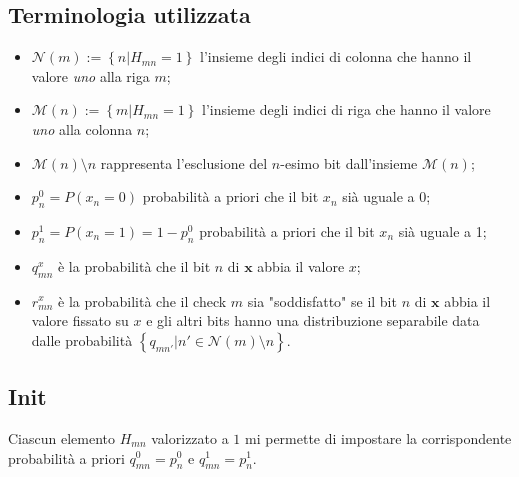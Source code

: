 \documentclass{article}
\begin{document}
	\subsection{Terminologia utilizzata}
	\begin{itemize}
		\item $\mathcal{N}(m) := \left\{ n | H_{mn} = 1 \right\}$ l'insieme degli indici di colonna che hanno il valore \textit{uno} alla riga $m$;
		\item $\mathcal{M}(n) := \left\{ m | H_{mn} = 1 \right\}$ l'insieme degli indici di riga che hanno il valore \textit{uno} alla colonna $n$;
		\item $\mathcal{M}(n)\setminus n$ rappresenta l'esclusione del $n$-esimo bit dall'insieme $\mathcal{M}(n)$;
		\item $p_n^0 = P(x_n=0)$ probabilità a priori che il bit $x_n$ sià uguale a 0;
		\item $p_n^1 = P(x_n=1)=1-p_n^0$ probabilità a priori che il bit $x_n$ sià uguale a 1;
		\item $q^x_{mn}$ è la probabilità che il bit $n$ di $\textbf{x}$ abbia il valore $x$;
		\item $r^x_{mn}$ è la probabilità che il check $m$ sia "soddisfatto" se il bit $n$ di $\textbf{x}$ abbia il valore fissato su $x$ e gli altri bits hanno una distribuzione separabile data dalle probabilità $\left\{ q_{mn'} | n' \in \mathcal{N}(m)\setminus n\right\}$.
	\end{itemize}
	\subsection{Init}
	Ciascun elemento $H_{mn}$ valorizzato a $1$ mi permette di impostare la corrispondente probabilità a priori $q^0_{mn} = p^0_n$ e $q^1_{mn} = p^1_n$.
\end{document}

